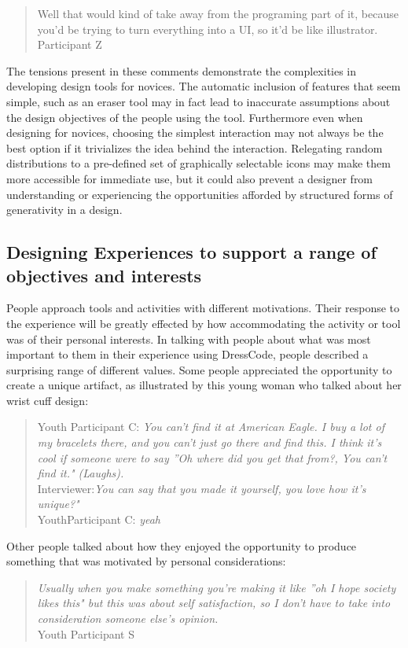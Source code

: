 \documentclass{sigchi}
\begin{document}
\begin{quotation}
 Well that would kind of take away from the programing part of it, because you’d be trying to turn everything into a UI, so it'd be like illustrator.
 \\Participant Z
\end{quotation}

The tensions present in these comments demonstrate the complexities in developing design tools for novices. The automatic inclusion of features that seem simple, such as an eraser tool may in fact lead to inaccurate assumptions about the design objectives of the people using the tool. Furthermore even when designing for novices, choosing the simplest interaction may not always be the best option if it trivializes the idea behind the interaction. Relegating random distributions to a pre-defined set of graphically selectable icons may make them more accessible for immediate use, but it could also prevent a designer from understanding or experiencing the opportunities afforded by structured forms of generativity in a design. 

\subsection{Designing Experiences to support a range of objectives and interests}
People approach tools and activities with different motivations. Their response to the experience will be greatly effected by how accommodating the activity or tool was of their personal interests. In talking with people about what was most important to them in their experience using DressCode, people described a surprising range of different values. Some people appreciated the opportunity to create a unique artifact, as illustrated by this young woman who talked about her wrist cuff design:
\begin{quotation}
Youth Participant C: \textit{You can't find it at American Eagle. I buy a lot of my bracelets there, and you can't just go there and find this. I think it's cool if someone were to say ''Oh where did you get that from?, You can't find it." (Laughs).}
\\Interviewer:\textit{You can say that you made it yourself, you love how it's unique?"}
\\YouthParticipant C: \textit{yeah}
\end{quotation}

Other people talked about how they enjoyed the opportunity to produce something that was motivated by personal considerations:
\begin{quotation}
\textit{Usually when you make something you're making it like ''oh I hope society likes this" but this was about self satisfaction, so I don't have to take into consideration someone else's opinion.}
\\Youth Participant S
\end{quotation}
\end{document}
